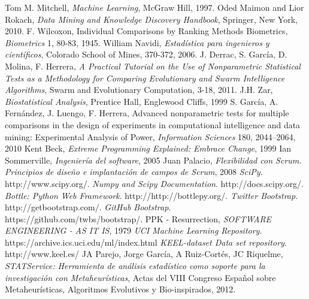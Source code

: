 
\begin{thebibliography}{99}
 Tom M. Mitchell, \textit{Machine Learning}, McGraw Hill, 1997.
 Oded Maimon and Lior Rokach, \textit{Data Mining and Knowledge Discovery Handbook}, Springer, New York, 2010.
 F. Wilcoxon, Individual Comparisons by Ranking Methods Biometrics, \textit{Biometrics} 1, 80-83, 1945.
 William Navidi, \textit{Estadística para ingenieros y científicos}, Colorado School of Mines, 370-372, 2006.
 J. Derrac, S. García, D. Molina, F. Herrera, \textit{A Practical Tutorial on the Use of Nonparametric Statistical Tests as a Methodology for Comparing Evolutionary and Swarm Intelligence Algorithms}, Swarm and Evolutionary Computation, 3-18, 2011.
 J.H. Zar, \textit{Biostatistical Analysis}, Prentice Hall, Englewood Cliffs, 1999
 S. García, A. Fernández, J. Luengo, F. Herrera, Advanced nonparametric tests for multiple comparisons in the design of experiments in computational intelligence and data mining: Experimental Analysis of Power, \textit{Information Sciences} 180, 2044–2064, 2010
 Kent Beck, \textit{Extreme Programming Explained: Embrace Change}, 1999
 Ian Sommerville, \textit{Ingeniería del software}, 2005
 Juan Palacio, \textit{Flexibilidad con Scrum. Principios de diseño e implantación de campos de Scrum}, 2008
 \textit{SciPy}. http://www.scipy.org/.
 \textit{Numpy and Scipy Documentation}. http://docs.scipy.org/.
 \textit{Bottle: Python Web Framework}. http://http://bottlepy.org/.
 \textit{Twitter Bootstrap}. http://getbootstrap.com/.
 \textit{GitHub Bootstrap}. https://github.com/twbs/bootstrap/.
 PPK - Resurrection, \textit{SOFTWARE ENGINEERING - AS IT IS}, 1979
 \textit{UCI Machine Learning Repository}. https://archive.ics.uci.edu/ml/index.html
 \textit{KEEL-dataset Data set repository}. http://www.keel.es/
 JA Parejo, Jorge García, A Ruiz-Cortés, JC Riquelme, \textit{STATService: Herramienta de análisis estadístico como soporte para la investigación con Metaheurísticas}, Actas del VIII Congreso Español sobre Metaheurísticas, Algoritmos Evolutivos y Bio-inspirados, 2012.
\end{thebibliography}